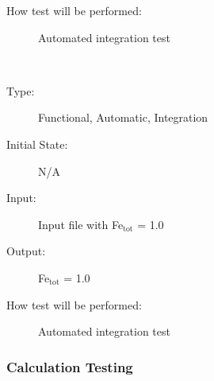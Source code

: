 \documentclass[12pt, titlepage]{article}
\newcounter{testnum} %
\begin{document}
\begin{addmargin}[2em]{0em}
\begin{addmargin}[2em]{0em}
\begin{description}
\item[How test will be performed:] Automated integration test\\
\end{description}
\end{addmargin}

\\
\begin{addmargin}[2em]{0em}
\begin{description}
\item[Type:] Functional, Automatic, Integration
					
\item[Initial State:] N/A
					
\item[Input:] Input file with Fe$_{\text{tot}}$ = 1.0\\
					
\item[Output:] Fe$_{\text{tot}}$ = 1.0
					
\item[How test will be performed:] Automated integration test\\
\end{description}
\end{addmargin}
\end{addmargin}



\subsubsection{Calculation Testing}
\end{document}
